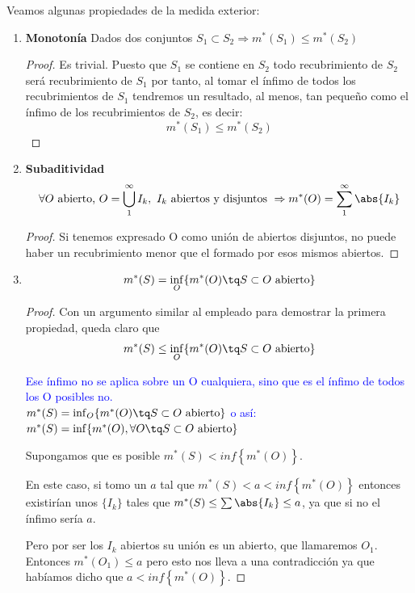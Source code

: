\documentclass{apuntes}
\begin{document}
Veamos algunas propiedades de la medida exterior:
\begin{enumerate}
%
\item \textbf{Monotonía} Dados dos conjuntos $S_1 \subset S_2 \Rightarrow m^*(S_1) \leq m^*(S_2)$
\begin{proof}
Es trivial. Puesto que $S_1$ se contiene en $S_2$ todo recubrimiento de $S_2$ será recubrimiento de $S_1$ por tanto, al tomar el ínfimo de todos los recubrimientos de $S_1$ tendremos un resultado, al menos, tan pequeño como el ínfimo de los recubrimientos de $S_2$, es decir:
\[m^*(S_1) \leq m^*(S_2)\]
\end{proof}

%
\item \textbf{Subaditividad}
\[\forall O \text{ abierto, } O = \bigcup_{1}^{\infty}I_k, \ I_k \text{ abiertos y disjuntos } \Rightarrow m^*(O)=\sum_{1}^{\infty}\abs{I_k}\]
\begin{proof}
Si tenemos expresado O como unión de abiertos disjuntos, no puede haber un recubrimiento menor que el formado por esos mismos abiertos.
\end{proof}

%
\item \[ m^*(S) = \inf_O \lbrace m^*(O)\tq S \subset O \text{ abierto} \rbrace \]
\begin{proof}
Con un argumento similar al empleado para demostrar la primera propiedad, queda claro que
\[ m^*(S) \leq \inf_O \lbrace m^*(O)\tq S \subset O \text{ abierto} \rbrace \]

\textcolor{blue}{Ese  ínfimo no se aplica sobre un O cualquiera, sino que es el ínfimo de todos los O posibles no.\\
$ m^*(S) = \inf_O \lbrace m^*(O)\tq S \subset O \text{ abierto} \rbrace$ o así:\\
$ m^*(S) = \inf \lbrace m^*(O), \forall O \tq S \subset O \text{ abierto} \rbrace$
}

Supongamos que es posible $m^*(S) < inf\left\{m^*(O)\right\}$.

En este caso, si tomo un $a$ tal que $ m^*(S) < a < inf\left\{ m^*(O)\right\}$ entonces existirían unos $\lbrace I_k\rbrace$ tales que $m^*(S) \leq \sum \abs{I_k} \leq a$, ya que si no el ínfimo sería $a$.

Pero por ser los $I_k$ abiertos su unión es un abierto, que llamaremos $O_1$. Entonces $m^*(O_1) \leq a$ pero esto nos lleva a una contradicción ya que habíamos dicho que $a < inf\left\{m^*(O)\right\}$.


\end{proof}
\end{enumerate}
\end{document}
